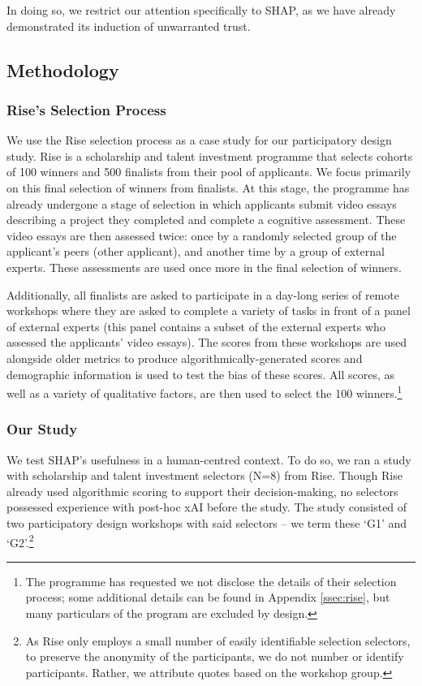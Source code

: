 \noindent In doing so, we restrict our attention specifically to SHAP, as we have already demonstrated its induction of unwarranted trust.

\subsection{Methodology}\label{ssec:cs_methods}
\subsubsection{Rise's Selection Process}
We use the Rise selection process as a case study for our participatory design study. Rise is a scholarship and talent investment programme that selects cohorts of 100 winners and 500 finalists from their pool of applicants. We focus primarily on this final selection of winners from finalists. At this stage, the programme has already undergone a stage of selection in which applicants submit video essays describing a project they completed 
and complete a cognitive assessment. These video essays are then assessed twice: once by a randomly selected group of the applicant's peers (other applicant), and another time by a group of external experts. These assessments are used once more in the final selection of winners.

Additionally, all finalists are asked to participate in a day-long series of remote workshops where they are asked to complete a variety of tasks in front of a panel of external experts (this panel contains a subset of the external experts who assessed the applicants' video essays). The scores from these workshops are used alongside older metrics to produce algorithmically-generated scores and demographic information is used to test the bias of these scores. All scores, as well as a variety of qualitative factors, are then used to select the 100 winners.\footnote{The programme has requested we not disclose the details of their selection process; some additional details can be found in Appendix \ref{ssec:rise}, but many particulars of the program are excluded by design.}

\subsubsection{Our Study}
We test SHAP's usefulness in a human-centred context. To do so, we ran a study with scholarship and talent investment selectors (N=8) from Rise. Though Rise already used algorithmic scoring to support their decision-making, no selectors possessed experience with post-hoc xAI before the study. The study consisted of two participatory design workshops with said selectors – we term these `G1' and `G2'.\footnote{As Rise only employs a small number of easily identifiable selection selectors, to preserve the anonymity of the participants, we do not number or identify participants. Rather, we attribute quotes based on the workshop group.}

